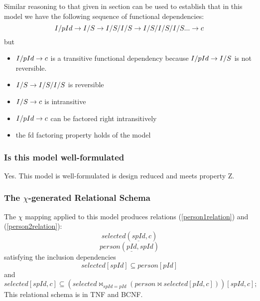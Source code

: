 Similar reasoning to that given in section  can be used to establish that 
in this model we have the following sequence of functional dependencies:
\begin{equation}
I/pId \rightarrow I/S \rightarrow I/S/I/S \rightarrow I/S/I/S/I/S ... \rightarrow c
\end{equation}
but 
\begin{itemize}
\item $I/pId \rightarrow c$ is a transitive functional dependency because $I/pId \rightarrow I/S$ is not reversible.
\item $I/S \rightarrow I/S/I/S$ is reversible 
\item $I/S \rightarrow c$ is intransitive
\item $I/pId \rightarrow c$ can be factored right intransitively
\item the fd factoring property holds of the model
\end{itemize}

\subsubsection{Is this model well-formulated}
Yes. This model is well-formulated is design reduced and meets property Z. 


\subsubsection{The $\chi$-generated Relational Schema}
The $\chi$ mapping applied to this model produces relations (\ref{person1relation}) and (\ref{person2relation}):
\begin{equation}
\label{person1relation}
selected(\underline{spId},  c)
\end{equation}
\begin{equation}
\label{person2relation}
person(\underline{pId}, spId)
\end{equation}
satisfying the inclusion dependencies
\begin{equation}
selected[spId] \subseteq person[pId]
\end{equation}
and
\begin{equation}
\label{spIdselectedcolour}
selected[spId,c] \subseteq (selected \bowtie_{spId=pId} 
                                       (person \bowtie selected [pId,c]) )
																			[spId,c];
\end{equation}
This relational schema is in TNF and BCNF.



